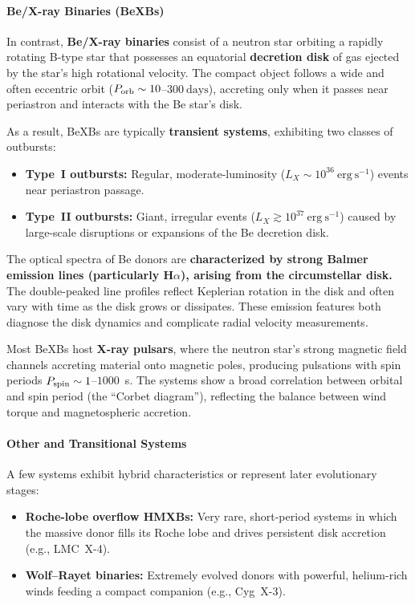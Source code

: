 \paragraph{Be/X-ray Binaries (BeXBs)}
In contrast, \textbf{Be/X-ray binaries} consist of a neutron star orbiting a rapidly rotating B-type star that possesses an equatorial \textbf{decretion disk} of gas ejected by the star’s high rotational velocity. The compact object follows a wide and often eccentric orbit ($P_{\rm orb} \sim 10$--$300~\mathrm{days}$), accreting only when it passes near periastron and interacts with the Be star’s disk. 
\par
As a result, BeXBs are typically \textbf{transient systems}, exhibiting two classes of outbursts:
\begin{itemize}
    \item \textbf{Type~I outbursts:} Regular, moderate-luminosity ($L_X \sim 10^{36}~\mathrm{erg~s^{-1}}$) events near periastron passage.
    \item \textbf{Type~II outbursts:} Giant, irregular events ($L_X \gtrsim 10^{37}~\mathrm{erg~s^{-1}}$) caused by large-scale disruptions or expansions of the Be decretion disk.
\end{itemize}

The optical spectra of Be donors are \textbf{characterized by strong Balmer emission lines (particularly H$\alpha$), arising from the circumstellar disk.} The double-peaked line profiles reflect Keplerian rotation in the disk and often vary with time as the disk grows or dissipates. These emission features both diagnose the disk dynamics and complicate radial velocity measurements.
\par
Most BeXBs host \textbf{X-ray pulsars}, where the neutron star’s strong magnetic field channels accreting material onto magnetic poles, producing pulsations with spin periods $P_{\rm spin} \sim 1$--$1000$~s. The systems show a broad correlation between orbital and spin period (the ``Corbet diagram''), reflecting the balance between wind torque and magnetospheric accretion.

\paragraph{Other and Transitional Systems}

A few systems exhibit hybrid characteristics or represent later evolutionary stages:
\begin{itemize}
    \item \textbf{Roche-lobe overflow HMXBs:} Very rare, short-period systems in which the massive donor fills its Roche lobe and drives persistent disk accretion (e.g., LMC~X-4).
    \item \textbf{Wolf–Rayet binaries:} Extremely evolved donors with powerful, helium-rich winds feeding a compact companion (e.g., Cyg~X-3).
\end{itemize}

